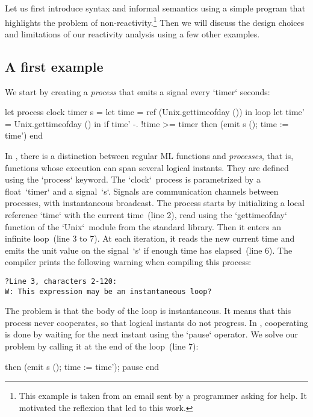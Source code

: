 \documentclass[9pt,preprint]{sigplanconf}
\begin{document}
Let us first introduce \rml{} syntax and informal semantics using a simple program that highlights the problem of non-reactivity.\footnote{This example is taken from an email sent by a \rml programmer asking for help. It motivated the reflexion that led to this work.} Then we will discuss the design choices and limitations of our reactivity analysis using a few other examples.

\subsection{A first example}
\label{sec:first_example}

We start by creating a \emph{process} that emits a signal every `timer` seconds:
%
\begin{rmlcl}
let process clock timer s =
  let time = ref (Unix.gettimeofday ()) in
  loop
    let time' = Unix.gettimeofday () in
    if time' -. !time >= timer
    then (emit s (); time := time')
  end
\end{rmlcl}
%
In \rml, there is a distinction between regular ML functions and \emph{processes}, that is, functions whose execution can span several logical instants.  They are defined using the `process` keyword. The `clock`~process is parametrized by a float~`timer` and a signal~`s`. Signals are communication channels between processes, with instantaneous broadcast. The process starts by initializing a local reference `time` with the current time~(line 2), read using the `gettimeofday` function of the `Unix`~module from the standard library. Then it enters an infinite loop~(line 3 to 7). At each iteration, it reads the new current time and emits the unit value on the signal~`s` if enough time has elapsed~(line 6). The compiler prints the following warning when compiling this process:
\begin{lstlisting}
?Line 3, characters 2-120:
W: This expression may be an instantaneous loop?
\end{lstlisting}
The problem is that the body of the loop is instantaneous. It means that this process never cooperates, so that logical instants do not progress. In \rml, cooperating is done by waiting for the next instant using the `pause` operator. We solve our problem by calling it at the end of the loop~(line 7):
\begin{rmlcl}[5]
[...]
    then (emit s (); time := time');
    pause 
  end
\end{rmlcl}
\end{document}
